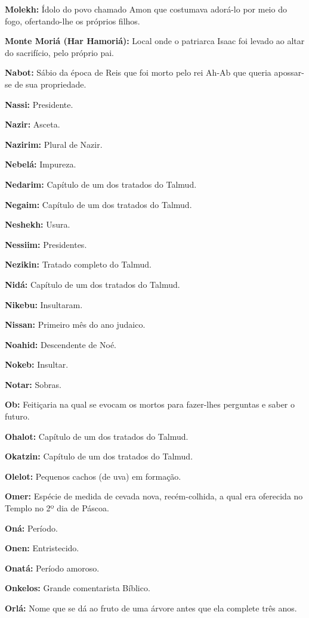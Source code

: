 \begin{hangparas}{.25in}{1}
{\textbf{Molekh:} Ídolo do povo chamado Amon que costumava adorá-lo por
meio do fogo, ofertando-lhe os próprios filhos.

\textbf{Monte Moriá (Har Hamoriá):} Local onde o patriarca Isaac foi
levado ao altar do sacrifício, pelo próprio pai.

\textbf{Nabot:} Sábio da época de Reis que foi morto pelo rei Ah-Ab que
queria apossar-se de sua propriedade.

\textbf{Nassi:} Presidente.

\textbf{Nazir:} Asceta.

\textbf{Nazirim:} Plural de Nazir.

\textbf{Nebelá:} Impureza.

\textbf{Nedarim:} Capítulo de um dos tratados do Talmud.

\textbf{Negaim:} Capítulo de um dos tratados do Talmud.

\textbf{Neshekh:} Usura.

\textbf{Nessiim:} Presidentes.

\textbf{Nezikin:} Tratado completo do Talmud.

\textbf{Nidá:} Capítulo de um dos tratados do Talmud.

\textbf{Nikebu:} Insultaram.

\textbf{Nissan:} Primeiro mês do ano judaico.

\textbf{Noahid:} Descendente de Noé.

\textbf{Nokeb:} Insultar.

\textbf{Notar:} Sobras.

\textbf{Ob:} Feitiçaria na qual se evocam os mortos para fazer-lhes
perguntas e saber o futuro.

\textbf{Ohalot:} Capítulo de um dos tratados do Talmud.

\textbf{Okatzin:} Capítulo de um dos tratados do Talmud.

\textbf{Olelot:} Pequenos cachos (de uva) em formação.

\textbf{Omer:} Espécie de medida de cevada nova, recém-colhida, a qual
era oferecida no Templo no 2º dia de Páscoa.

\textbf{Oná:} Período.

\textbf{Onen:} Entristecido.

\textbf{Onatá:} Período amoroso.

\textbf{Onkelos:} Grande comentarista Bíblico.

\textbf{Orlá:} Nome que se dá ao fruto de uma árvore antes que ela complete três anos.

}
\end{hangparas}
